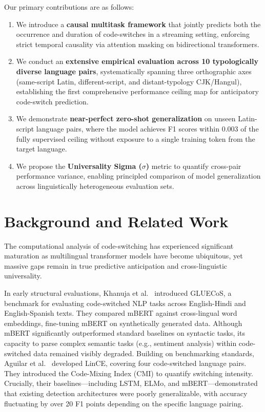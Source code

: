 \documentclass[sigconf,nonacm]{acmart}
\begin{document}
Our primary contributions are as follows:
\begin{enumerate}
    \item We introduce a \textbf{causal multitask framework} that jointly predicts both the occurrence and duration of code-switches in a streaming setting, enforcing strict temporal causality via attention masking on bidirectional transformers.
    \item We conduct an \textbf{extensive empirical evaluation across 10 typologically diverse language pairs}, systematically spanning three orthographic axes (same-script Latin, different-script, and distant-typology CJK/Hangul), establishing the first comprehensive performance ceiling map for anticipatory code-switch prediction.
    \item We demonstrate \textbf{near-perfect zero-shot generalization} on unseen Latin-script language pairs, where the model achieves F1 scores within 0.003 of the fully supervised ceiling without exposure to a single training token from the target language.
    \item We propose the \textbf{Universality Sigma ($\sigma$)} metric to quantify cross-pair performance variance, enabling principled comparison of model generalization across linguistically heterogeneous evaluation sets.
\end{enumerate}

\section{Background and Related Work}

The computational analysis of code-switching has experienced significant maturation as multilingual transformer models have become ubiquitous, yet massive gaps remain in true predictive anticipation and cross-linguistic universality.

In early structural evaluations, Khanuja et al.~\cite{khanuja2020gluecos} introduced GLUECoS, a benchmark for evaluating code-switched NLP tasks across English-Hindi and English-Spanish texts. They compared mBERT against cross-lingual word embeddings, fine-tuning mBERT on synthetically generated data. Although mBERT significantly outperformed standard baselines on syntactic tasks, its capacity to parse complex semantic tasks (e.g., sentiment analysis) within code-switched data remained visibly degraded. Building on benchmarking standards, Aguilar et al.~\cite{aguilar2020lince} developed LinCE, covering four code-switched language pairs. They introduced the Code-Mixing Index (CMI) to quantify switching intensity. Crucially, their baselines—including LSTM, ELMo, and mBERT—demonstrated that existing detection architectures were poorly generalizable, with accuracy fluctuating by over 20 F1 points depending on the specific language pairing.
\end{document}
